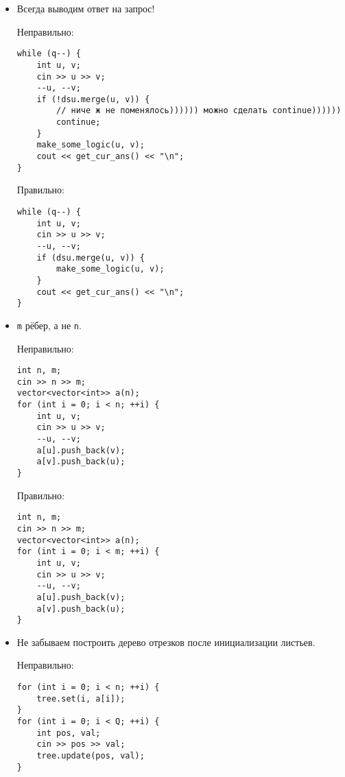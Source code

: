 \begin{itemize}
\item Всегда выводим ответ на запрос!

Неправильно:

\begin{verbatim}
while (q--) {
    int u, v;
    cin >> u >> v;
    --u, --v;
    if (!dsu.merge(u, v)) {
        // ниче ж не поменялось)))))) можно сделать continue))))))
        continue;
    }
    make_some_logic(u, v);
    cout << get_cur_ans() << "\n";
}
\end{verbatim}

Правильно:

\begin{verbatim}
while (q--) {
    int u, v;
    cin >> u >> v;
    --u, --v;
    if (dsu.merge(u, v)) {
        make_some_logic(u, v);
    }
    cout << get_cur_ans() << "\n";
}
\end{verbatim}

\item \texttt{m} рёбер, а не \texttt{n}.

Неправильно:

\begin{verbatim}
int n, m;
cin >> n >> m;
vector<vector<int>> a(n);
for (int i = 0; i < n; ++i) {
    int u, v;
    cin >> u >> v;
    --u, --v;
    a[u].push_back(v);
    a[v].push_back(u);
}
\end{verbatim}

Правильно:

\begin{verbatim}
int n, m;
cin >> n >> m;
vector<vector<int>> a(n);
for (int i = 0; i < m; ++i) {
    int u, v;
    cin >> u >> v;
    --u, --v;
    a[u].push_back(v);
    a[v].push_back(u);
}
\end{verbatim}

\item Не забываем построить дерево отрезков после инициализации листьев.

Неправильно:

\begin{verbatim}
for (int i = 0; i < n; ++i) {
    tree.set(i, a[i]);
}
for (int i = 0; i < Q; ++i) {
    int pos, val;
    cin >> pos >> val;
    tree.update(pos, val);
}
\end{verbatim}


\end{itemize}
